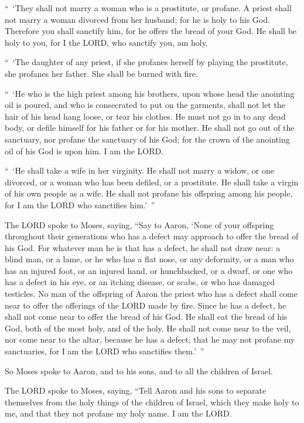 \myverse{}“ ‘They shall not marry a woman who is a prostitute, or profane.
A priest shall not marry a woman divorced from her husband; for he is holy to his God.
\myverse{}Therefore you shall sanctify him, for he offers the bread of your God. He shall
be holy to you, for I the LORD, who sanctify you, am holy.


\myverse{}“ ‘The daughter of any priest, if she profanes herself by playing
the prostitute, she profanes her father. She shall be burned with fire.


\myverse{}“ ‘He who is the high priest among his brothers, upon whose head
the anointing oil is poured, and who is consecrated to put on the garments, shall not let the hair of
his head hang loose, or tear his clothes.
\myverse{}He must not go in to any dead body, or defile himself for his father or for
his mother.
\myverse{}He shall not go out of the sanctuary, nor profane the sanctuary of his God;
for the crown of the anointing oil of his God is upon him. I am the LORD.


\myverse{}“ ‘He shall take a wife in her virginity.
\myverse{}He shall not marry a widow, or one divorced, or a woman who has been defiled,
or a prostitute. He shall take a virgin of his own people as a wife.
\myverse{}He shall not profane his offspring among his people, for I am the LORD who
sanctifies him.’ ”


\myverse{}The LORD spoke to Moses, saying,
\myverse{}“Say to Aaron, ‘None of your offspring throughout their generations who has
a defect may approach to offer the bread of his God.
\myverse{}For whatever man he is that has a defect, he shall not draw near: a blind
man, or a lame, or he who has a flat nose, or any deformity,
\myverse{}or a man who has an injured foot, or an injured hand,
\myverse{}or hunchbacked, or a dwarf, or one who has a defect in his eye, or an itching
disease, or scabs, or who has damaged testicles.
\myverse{}No man of the offspring of Aaron the priest who has a defect shall come near
to offer the offerings of the LORD made by fire. Since he has a defect, he shall not come near to offer
the bread of his God.
\myverse{}He shall eat the bread of his God, both of the most holy, and of the holy.
\myverse{}He shall not come near to the veil, nor come near to the altar, because he
has a defect; that he may not profane my sanctuaries, for I am the LORD who sanctifies them.’ ”


\myverse{}So Moses spoke to Aaron, and to his sons, and to all the children
of Israel.


\mychapter{} \myverse*{}The LORD spoke to Moses, saying,
\myverse{}“Tell Aaron and his sons to separate themselves from the holy things of the
children of Israel, which they make holy to me, and that they not profane my holy name. I am the LORD.


